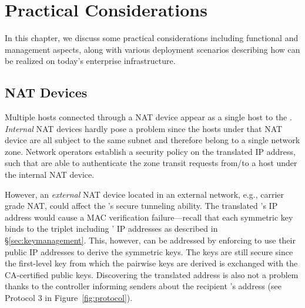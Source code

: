 \chapter{Practical Considerations}
\label{practical}

In this chapter, we discuss some practical considerations including functional and
management aspects, along with various deployment scenarios describing how \name can
be realized on today's enterprise infrastructure.


\section{NAT Devices}
\label{sec:nat}
Multiple hosts connected through a NAT device appear as a single host to the
\tp. \textit{Internal} NAT devices hardly pose a problem since the hosts under that NAT
device are all subject to the same subnet and therefore belong to a single network zone.
Network operators establish a security policy on the translated IP address, such
that \tps are able to authenticate the zone transit requests from/to a host under the
internal NAT device.

However, an \textit{external} NAT device located in an external network, e.g., carrier grade NAT,
could affect the \tp's secure tunneling ability. The translated \tp's IP address
would cause a MAC verification failure---recall that each symmetric key binds to the
triplet including \tps' IP addresses as described in \S\ref{sec:keymanagement}.
This, however, can be addressed by enforcing \tps to use their public IP addresses
to derive the symmetric keys. The keys are still secure since the first-level key
from which the pairwise keys are derived is exchanged with the CA-certified public
keys. Discovering the translated \tp address is also not a problem thanks to
the controller informing senders about the recipient \tp's address (see Protocol 3 in
Figure~\ref{fig:protocol}).



